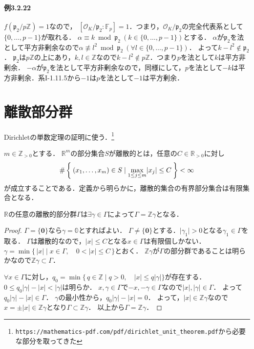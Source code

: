 \paragraph{例3.2.22}
$f(\mathfrak{p}_2/p\mathbb{Z})=1$なので，
$[\mathcal{O}_K/\mathfrak{p}_2:\mathbb{F}_p]=1$．つまり，$\mathcal{O}_K/\mathfrak{p}_2$の完全代表系として$\{0,\ldots,p-1\}$が取れる．
$\alpha\equiv k\bmod\mathfrak{p}_2\ (k\in\{0,\ldots,p-1\})$とする．
$\alpha$が$\mathfrak{p}_2$を法として平方非剰余なので$\alpha\not\equiv l^2\bmod\mathfrak{p}_2 ~ (\forall l\in\{0,\ldots,p-1\})$．
よって$k-l^2\not\in\mathfrak{p}_2$．
$\mathfrak{p}_2$は$p\mathbb{Z}$の上にあり，$k,l\in\mathbb{Z}$なので$k-l^2\not\in p\mathbb{Z}$．つまり$p$を法として$k$は平方非剰余．
$-\alpha$が$\mathfrak{p}_2$を法として平方非剰余なので，同様にして，$p$を法として$-k$は平方非剰余．系I-1.11.5から$-1$は$p$を法として$-1$は平方剰余．

\section*{離散部分群}
Dirichletの単数定理の証明に使う．\footnote{\verb|https://mathematics-pdf.com/pdf/dirichlet_unit_theorem.pdf|から必要な部分を取ってきた}

\begin{dfn}
  $m\in\mathbb{Z}_{>0}$とする．
  $\mathbb{R}^m$の部分集合$S$が離散的とは，任意の$C\in\mathbb{R}_{>0}$に対し
  \[\#\Set{(x_1,\ldots,x_m)\in S\mid\max_{1\leq j\leq m}\lvert x_j\rvert\leq C}<\infty\]
  が成立することである．定義から明らかに，離散的集合の有界部分集合は有限集合となる．
\end{dfn}

\begin{screen}
  \begin{lem}
    \label{discrete_subgroup_lemma_1}
    $\mathbb{R}$の任意の離散的部分群$\Gamma$は$\exists\gamma\in\Gamma$によって$\Gamma=\mathbb{Z}\gamma$となる．
  \end{lem}
\end{screen}
\begin{proof}
  $\Gamma=\{\boldsymbol{0}\}$なら$\gamma=\mathbb{0}$とすればよい．
  $\Gamma\neq\{\boldsymbol{0}\}$とする．$\lvert\gamma_1\rvert>0$となる$\gamma_1\in\Gamma$を取る．
  $\Gamma$は離散的なので，$\lvert x\rvert\leq C$となる$x\in\Gamma$は有限個しかない．
  $\gamma=\min\{\,\lvert x\rvert\mid x\in\Gamma,\quad 0<\lvert x\rvert\leq C\,\}$とおく．
  $\mathbb{Z}\gamma$が$\Gamma$の部分群であることは明らかなので$\mathbb{Z}\gamma\subset\Gamma$．

  $\forall x\in\Gamma$に対し，$q_0=\min\{\,q\in\mathbb{Z}\mid q>0,\quad\lvert x\rvert\leq q\lvert\gamma\rvert\}$が存在する．
  $0\leq q_0\lvert\gamma\rvert-\lvert x\rvert<\lvert\gamma\rvert$は明らか．
  $x,\gamma\in\Gamma$で$-x,-\gamma\in\Gamma$なので$\lvert x\rvert,\lvert\gamma\rvert\in\Gamma$．
  よって$q_0\lvert\gamma\rvert-\lvert x\rvert\in\Gamma$．
  $\gamma$の最小性から，$q_0\lvert\gamma\rvert-\lvert x\rvert=0$．
  よって，$\lvert x\rvert\in\mathbb{Z}\gamma$なので$x=\pm\lvert x\rvert\in\mathbb{Z}\gamma$となり$\Gamma\subset\mathbb{Z}\gamma$．
  以上から$\Gamma=\mathbb{Z}\gamma$．
\end{proof}

